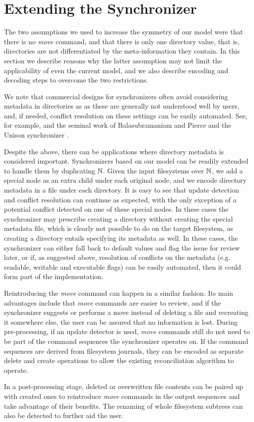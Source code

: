 
\section{Extending the Synchronizer}

The two assumptions we used to increase the symmetry of our model were
that there is no \emph{move} command,
and that
there is only one directory value, that is, directories are not differentiated
by the meta-information they contain.
In this section we describe reasons why the latter assumption may not limit the applicability
of even the current model, and we also describe encoding and decoding steps
to overcome the two restrictions.

We note that commercial designs for synchronizers 
often avoid considering metadata in directories as
as these are generally not understood well by users,
and, if needed, conflict resolution on these settings can be easily automated.
See, for example, \cite{BZ} and the seminal work of Balasubramaniam and Pierce and the Unison synchronizer \cite{BP}.

Despite the above, there can be applications where directory metadata
is considered important.
Synchronizers based on our model can be readily extended to handle them
by duplicating $\mathbb{N}$. 
Given the input filesystems over $\mathbb{N}$, we add a special node as an extra child under each original node,
and we encode directory metadata in a file under each directory.
It is easy to see that update detection and conflict resolution can continue as expected,
with the only exception of a potential conflict detected on one of these special nodes.
In these cases the synchronizer may prescribe creating a directory without creating
the special metadata file, which is clearly not possible to do on the target filesystem,
as creating a directory entails specifying its metadata as well.
In these cases, the synchronizer can either fall back to default values and flag the issue
for review later, or if, as suggested above, resolution of conflicts on the metadata (e.g. readable, writable and executable flags)
can be easily automated, then it could form part of the implementation.

Reintroducing the \emph{move} command can happen in a similar fashion.
Its main advantages include that 
\emph{move} commands are easier to review,
and if the synchronizer suggests or performs a move instead
of deleting a file and recreating it somewhere else, the user
can be assured that no information is lost.
During pre-processing, if an update detector is used,
\emph{move} commands still do not need to be part of the command sequences
the synchronizer operates on.
If the command sequences are derived from filesystem journals, they
can be encoded as separate delete and create operations to allow the existing reconciliation
algorithm to operate.

In a post-processing stage, deleted or overwritten file contents
can be paired up with created ones to reintroduce \emph{move}
commands in the output sequences and take advantage of their benefits.
The renaming of whole filesystem subtrees can also be detected
to further aid the user.
